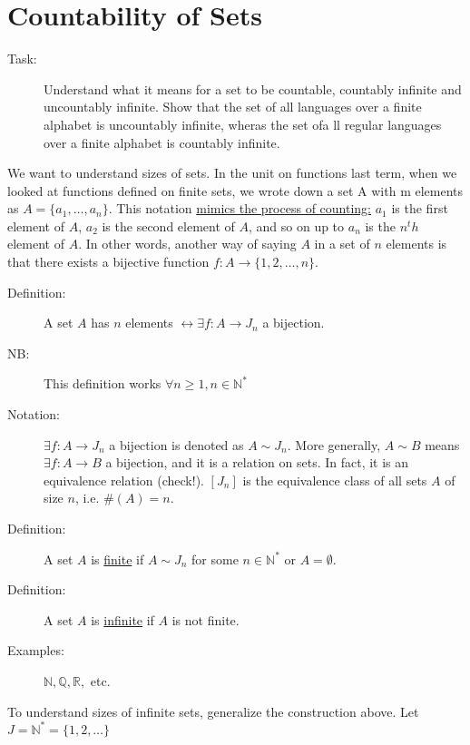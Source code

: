 \section{Countability of Sets}
	\begin{description}
		\item[Task:] Understand what it means for a set to be countable, countably infinite and uncountably infinite. Show that the set of all languages over a finite alphabet is uncountably infinite, wheras the set ofa ll regular languages over a finite alphabet is countably infinite.
	\end{description}
	We want to understand sizes of sets.
	In the unit on functions last term, when we looked at functions defined on finite sets, we wrote down a set A with m elements as $A = \{a_1, \dots, a_n\}$.
	This notation \underline{mimics the process of counting:} $a_1$ is the first element of $A$, $a_2$ is the second element of $A$, and so on up to $a_n$ is the $n^th$ element of $A$.
	In other words, another way of saying $A$ in a set of $n$ elements is that there exists a bijective function $f: A \rightarrow \{1, 2, \dots, n\}$.

	\begin{description}
		\item[Definition:] A set $A$ has $n$ elements $\leftrightarrow \exists f: A \rightarrow J_n$ a bijection.
		\item[NB:] This definition works $\forall n \geq 1, n \in \mathbb{N}^\ast$
		\item[Notation:] $\exists f: A \rightarrow J_n$ a bijection is denoted as $A \sim J_n$.
			More generally, $A \sim B$ means $\exists f: A \rightarrow B$ a bijection, and it is a relation on sets.
			In fact, it is an equivalence relation (check!). $[J_n]$ is the equivalence class of all sets $A$ of size $n$, i.e. $\#(A) = n$.
	\end{description}

	\begin{description}
		\item[Definition:] A set $A$ is \underline{finite} if $A \sim J_n$ for some $n \in \mathbb{N}^\ast$ or $A = \emptyset$.
		\item[Definition:] A set $A$ is \underline{infinite} if $A$ is not finite.
		\item[Examples:] $\mathbb{N, Q, R,}$ etc.
	\end{description}

	To understand sizes of infinite sets, generalize the construction above. Let $J = \mathbb{N}^\ast = \{1, 2, \dots \}$

